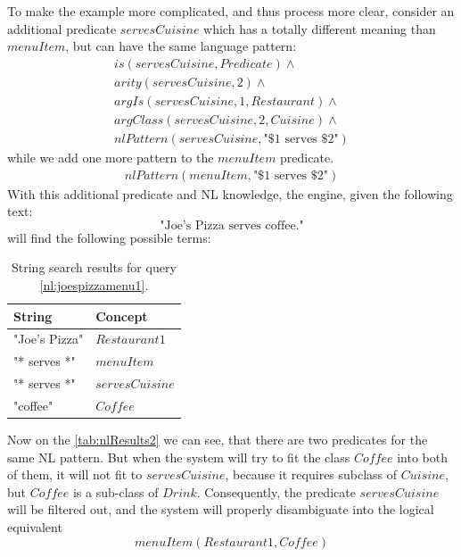 To make the example more complicated, and thus process more clear, consider
an additional predicate $servesCuisine$ which has a totally different meaning
than $menuItem$, but can have the same language pattern:
\begin{equation*}
\begin{gathered}
    is(servesCuisine,Predicate) \land \\
	arity(servesCuisine,2)\land\\
	argIs(servesCuisine,1,Restaurant) \land\\
	argClass(servesCuisine,2, Cuisine) \land \\
	nlPattern(servesCuisine, \text{"\$1 serves \$2"}) 
\end{gathered}
\end{equation*}
while we add one more pattern to the $menuItem$ predicate.
\begin{equation*}
\begin{gathered}
	nlPattern(menuItem, \text{"\$1 serves \$2"}) 
\end{gathered}
\end{equation*}
With this additional predicate and NL knowledge, the engine, given the following
text:
\begin{equation}\label{nl:joespizzamenu1}
\text{"Joe's Pizza serves coffee."}
\end{equation}
will find the following possible terms:

\begin{table}[H]
\centering
\caption{String search results for query \ref{nl:joespizzamenu1}.}
\label{tab:nlResults2}
\begin{tabular}{|l|l|}
	\hline
	\textbf{String} & \textbf{Concept} \\
    \hline
    "Joe's Pizza" & $Restaurant1$ \\
    \hline
    "* serves *" & $menuItem$ \\
    \hline
	"* serves *" & $servesCuisine$\\
	\hline
    "coffee" & $Coffee$ \\
    \hline
\end{tabular}
\end{table}
Now on the \autoref{tab:nlResults2} we can see, that there are two predicates
for the same NL pattern. But when the system will try to fit the class $Coffee$
into both of them, it will not fit to $servesCuisine$, because it requires
subclass of $Cuisine$, but $Coffee$ is a sub-class of $Drink$. Consequently,
the predicate $servesCuisine$ will be filtered out, and the system will
properly disambiguate into the logical equivalent
\begin{equation*}
	menuItem(Restaurant1,Coffee)
\end{equation*}

